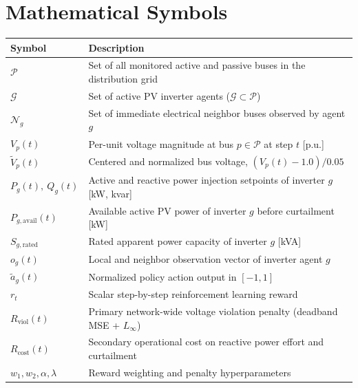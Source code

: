 \section*{Mathematical Symbols}
\noindent
\begin{tabularx}{\textwidth}{@{}l X@{}}
\toprule
\textbf{Symbol} & \textbf{Description} \\
\midrule
$\mathcal{P}$ & Set of all monitored active and passive buses in the distribution grid \\
$\mathcal{G}$ & Set of active PV inverter agents ($\mathcal{G} \subset \mathcal{P}$) \\
$\mathcal{N}_g$ & Set of immediate electrical neighbor buses observed by agent $g$ \\
$V_p(t)$ & Per-unit voltage magnitude at bus $p \in \mathcal{P}$ at step $t$ [p.u.] \\
$\tilde{V}_p(t)$ & Centered and normalized bus voltage, $(V_p(t) - 1.0) / 0.05$ \\
$P_g(t),\ Q_g(t)$ & Active and reactive power injection setpoints of inverter $g$ [kW, kvar] \\
$P_{g,\text{avail}}(t)$ & Available active PV power of inverter $g$ before curtailment [kW] \\
$S_{g,\text{rated}}$ & Rated apparent power capacity of inverter $g$ [kVA] \\
$o_g(t)$ & Local and neighbor observation vector of inverter agent $g$ \\
$\tilde{a}_g(t)$ & Normalized policy action output in $[-1, 1]$ \\
$r_t$ & Scalar step-by-step reinforcement learning reward \\
$R_{\text{viol}}(t)$ & Primary network-wide voltage violation penalty (deadband MSE + $L_\infty$) \\
$R_{\text{cost}}(t)$ & Secondary operational cost on reactive power effort and curtailment \\
$w_1, w_2, \alpha, \lambda$ & Reward weighting and penalty hyperparameters \\
\bottomrule
\end{tabularx}

